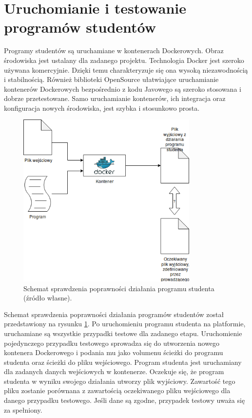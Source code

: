 \vfill

\section{Uruchomianie i testowanie programów studentów}
\label{run-and-test}

Programy studentów są uruchamiane w kontenerach Dockerowych.
Obraz środowiska jest ustalany dla zadanego projektu.
Technologia Docker jest szeroko używana komercyjnie.
Dzięki temu charakteryzuje się ona wysoką niezawodnością i stabilnością.
Również biblioteki OpenSource ułatwiające uruchamianie kontenerów Dockerowych bezpośrednio z kodu Javowego są szeroko stosowana i dobrze przetestowane.
Samo uruchamianie kontenerów, ich integracja oraz konfiguracja nowych środowiska, jest szybka i stosunkowo prosta.

\begin{figure}[h]
    \centering
    \includegraphics[width = 9cm]{chapter02/single_test_case.png}
    \caption{Schemat sprawdzenia poprawności działania programu studenta (źródło własne).}
    \label{fig:single-test-case}
\end{figure}

Schemat sprawdzenia poprawności działania programów studentów został przedstawiony na rysunku \ref{fig:single-test-case}.
Po uruchomieniu programu studenta na platformie, uruchamiane są wszystkie przypadki testowe dla zadanego etapu.
Uruchomienie pojedynczego przypadku testowego sprowadza się do utworzenia nowego kontenera Dockerowego i podania mu jako volumenu ścieżki do programu studenta oraz ścieżki do pliku wejściowego.
Program studenta jest uruchamiany dla zadanych danych wejściowych w kontenerze.
Oczekuje się, że program studenta w wyniku swojego działania utworzy plik wyjściowy.
Zawartość tego pliku zostanie porównana z zawartością oczekiwanego pliku wejściowego dla danego przypadku testowego. Jeśli dane są zgodne, przypadek testowy uważa się za spełniony.


